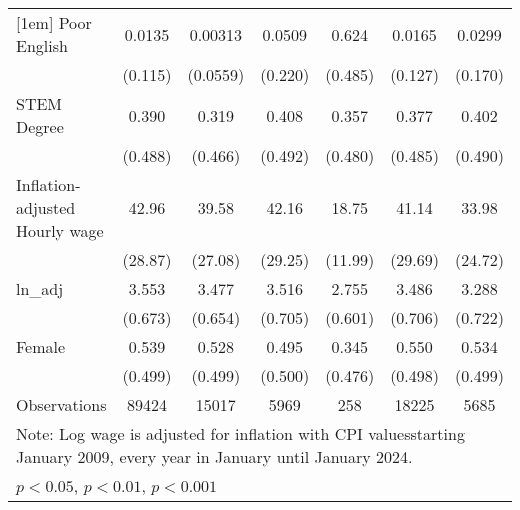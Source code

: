 \begin{table}[htbp]
\begin{tabular}{l*{6}{c}}
[1em]
Poor English        &      0.0135         &     0.00313         &      0.0509         &       0.624         &      0.0165         &      0.0299         \\
                    &     (0.115)         &    (0.0559)         &     (0.220)         &     (0.485)         &     (0.127)         &     (0.170)         \\
[1em]
STEM Degree         &       0.390         &       0.319         &       0.408         &       0.357         &       0.377         &       0.402         \\
                    &     (0.488)         &     (0.466)         &     (0.492)         &     (0.480)         &     (0.485)         &     (0.490)         \\
[1em]
Inflation-adjusted Hourly wage&       42.96         &       39.58         &       42.16         &       18.75         &       41.14         &       33.98         \\
                    &     (28.87)         &     (27.08)         &     (29.25)         &     (11.99)         &     (29.69)         &     (24.72)         \\
[1em]
ln\_adj              &       3.553         &       3.477         &       3.516         &       2.755         &       3.486         &       3.288         \\
                    &     (0.673)         &     (0.654)         &     (0.705)         &     (0.601)         &     (0.706)         &     (0.722)         \\
[1em]
Female              &       0.539         &       0.528         &       0.495         &       0.345         &       0.550         &       0.534         \\
                    &     (0.499)         &     (0.499)         &     (0.500)         &     (0.476)         &     (0.498)         &     (0.499)         \\
\hline
Observations        &       89424         &       15017         &        5969         &         258         &       18225         &        5685         \\
\hline\hline
\multicolumn{7}{l}{\footnotesize Note: Log wage is adjusted for inflation with CPI valuesstarting January 2009, every year in January until January 2024.}\\
\multicolumn{7}{l}{\footnotesize \sym{*} \(p<0.05\), \sym{**} \(p<0.01\), \sym{***} \(p<0.001\)}\\
\end{tabular}
\end{table}
